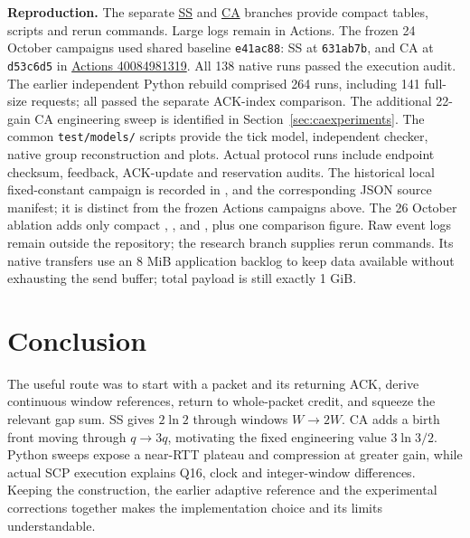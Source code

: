 \documentclass[sigconf,nonacm]{acmart}
\begin{document}
\textbf{Reproduction.} The separate
\href{https://github.com/skaiui2/SCP/tree/research/slowstart-nextslot-q16-20261022/reproduction}{SS}
and
\href{https://github.com/skaiui2/SCP/tree/research/ca-nextslot-q16-20261022/reproduction}{CA}
branches provide compact tables, scripts and rerun commands. Large logs
remain in Actions. The frozen 24 October campaigns used shared baseline
\texttt{e41ac88}: SS at \texttt{631ab7b}, and CA at \texttt{d53c6d5} in
\href{https://github.com/skaiui2/SCP/actions/runs/40084981319}{Actions 40084981319}.
All 138 native runs passed the execution audit. The earlier independent
Python rebuild comprised 264 runs, including 141 full-size requests;
all passed the separate ACK-index comparison. The additional 22-gain CA
engineering sweep is identified in Section~\ref{sec:caexperiments}.
The common \texttt{test/models/} scripts provide the tick model, independent
checker, native group reconstruction and plots. Actual protocol runs
include endpoint checksum, feedback, ACK-update and reservation audits.
The historical local fixed-constant campaign is recorded in
,
 and the corresponding JSON source
manifest; it is distinct from the frozen Actions campaigns above.
The 26 October ablation adds only compact
,
,
 and
, plus one comparison figure. Raw event
logs remain outside the repository; the research branch supplies rerun
commands. Its native transfers use an 8 MiB application backlog to keep
data available without exhausting the send buffer; total payload is
still exactly 1 GiB.

\section{Conclusion}
The useful route was to start with a packet and its returning ACK, derive
continuous window references, return to whole-packet credit, and squeeze
the relevant gap sum. SS gives $2\ln2$ through windows $W\to2W$.
CA adds a birth front moving through $q\to3q$, motivating the fixed
engineering value $3\ln3/2$. Python sweeps expose a near-RTT plateau and
compression at greater gain, while actual SCP execution explains Q16,
clock and integer-window differences. Keeping the construction, the
earlier adaptive reference and the experimental corrections together
makes the implementation choice and its limits understandable.
\end{document}
